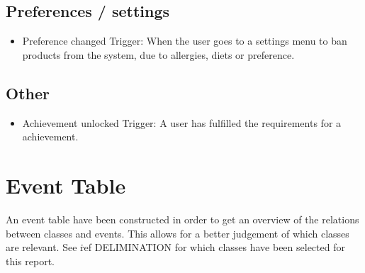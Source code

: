 \subsection{Preferences / settings}
\begin{itemize}
\item Preference changed
    \subitem Trigger: When the user goes to a settings menu to ban products from the system, due to allergies, diets or preference.
\end{itemize}


\subsection{Other}
\begin{itemize}
\item Achievement unlocked
    \subitem Trigger: A user has fulfilled the requirements for a achievement.
\end{itemize}

\section{Event Table}
An event table have been constructed in order to get an overview of the relations between classes and events. This allows for a better judgement of which classes are relevant. See \.ref DELIMINATION for which classes have been selected for this report.


